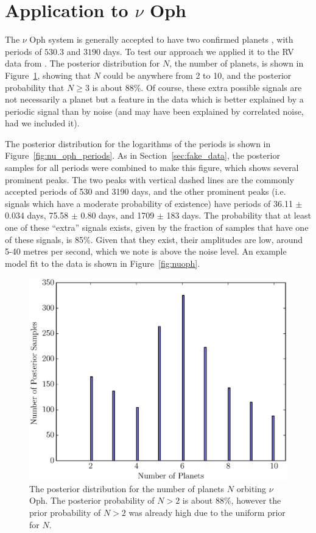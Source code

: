 \documentclass[useAMS,usenatbib]{mn2e}
\begin{document}
\section{Application to $\nu$ Oph}\label{sec:nu_oph}
The $\nu$ Oph system is generally accepted to have two confirmed planets
\citep[e.g.][]{2011AIPC.1331..102Q, 2012PASJ...64..135S, fengji}, with periods
of $530.3$ and $3190$ days. To test our approach we applied it to the RV
data from \citet{2012PASJ...64..135S}.
The posterior distribution for $N$, the number of planets, is shown in
Figure~\ref{fig:nu_oph_N}, showing that $N$ could be anywhere from 2 to 10,
and the posterior probability that $N \geq 3$ is about 88\%. Of course, these
extra possible signals are not necessarily a planet but a feature in the data
which is better explained by a periodic signal than by noise (and may have been
explained by correlated noise, had we included it).

The posterior distribution for the logarithms of the periods is shown in
Figure~\ref{fig:nu_oph_periods}. As in Section~\ref{sec:fake_data},
the posterior samples for all periods were combined to make this figure, which
shows several prominent peaks. 
The two peaks with vertical dashed lines are the commonly accepted periods of
530 and 3190 days, and the other prominent peaks (i.e. signals which have a
moderate probability of existence) have periods of 36.11 $\pm$ 0.034 days,
75.58 $\pm$ 0.80 days, and 1709 $\pm$ 183 days.
The probability that
at least one of these ``extra'' signals exists, given by the fraction of
samples that have one of these signals, is 85\%.
Given that they exist, their amplitudes are low, around 5-40 metres per second,
which we note is above the noise level. An example model fit to the data is
shown in Figure~\ref{fig:nuoph}.

\begin{figure}
\includegraphics[scale=0.45]{Figures/nu_oph_N.eps}
\caption{The posterior distribution for the number of planets $N$ orbiting
$\nu$ Oph. The posterior probability of $N > 2$ is about 88\%, however the
prior probability of $N > 2$ was already high due to the uniform prior for $N$.
\label{fig:nu_oph_N}}
\end{figure}
\end{document}
